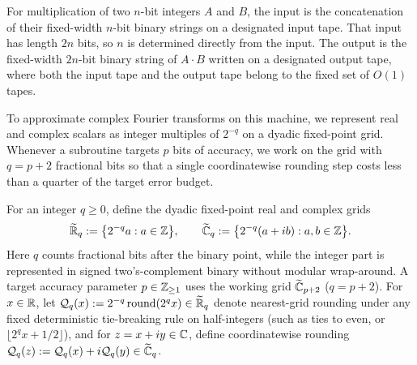 For multiplication of two $n$-bit integers $A$ and $B$, the input is the concatenation of their fixed-width $n$-bit binary strings on a designated input tape. That input has length $2n$ bits, so $n$ is determined directly from the input. The output is the fixed-width $2n$-bit binary string of $A \cdot B$ written on a designated output tape, where both the input tape and the output tape belong to the fixed set of $O(1)$ tapes.

To approximate complex Fourier transforms on this machine, we represent real and complex scalars as integer multiples of $2^{-q}$ on a dyadic fixed-point grid. Whenever a subroutine targets $p$ bits of accuracy, we work on the grid with $q = p + 2$ fractional bits so that a single coordinatewise rounding step costs less than a quarter of the target error budget.

\begin{definition}\label{def:grid}
For an integer $q \ge 0$, define the dyadic fixed-point real and complex grids
\[
  \widetilde{\mathbb{R}}_q := \bigl\{2^{-q} a : a \in \mathbb{Z}\bigr\}, \qquad \widetilde{\mathbb{C}}_q := \bigl\{2^{-q}(a + i b) : a, b \in \mathbb{Z}\bigr\}.
\]
Here $q$ counts fractional bits after the binary point, while the integer part is represented in signed two's-complement binary without modular wrap-around. A target accuracy parameter $p \in \mathbb{Z}_{\ge 1}$ uses the working grid $\widetilde{\mathbb{C}}_{p+2}$ ($q = p + 2$). For $x \in \mathbb{R}$, let $\mathcal{Q}_q(x) := 2^{-q}\operatorname{round}(2^q x) \in \widetilde{\mathbb{R}}_q$ denote nearest-grid rounding under any fixed deterministic tie-breaking rule on half-integers (such as ties to even, or $\lfloor 2^q x + 1/2 \rfloor$), and for $z = x + i y \in \mathbb{C}$, define coordinatewise rounding $\mathcal{Q}_q(z) := \mathcal{Q}_q(x) + i \mathcal{Q}_q(y) \in \widetilde{\mathbb{C}}_q$.
\end{definition}

